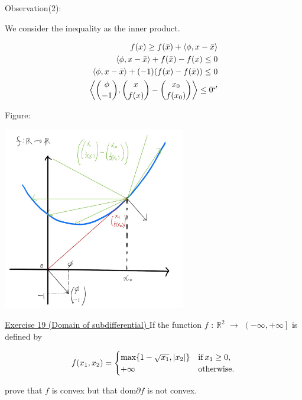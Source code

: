 \documentclass[a4paper,11pt]{jsarticle}
\begin{document}
Observation(2):

We consider the inequality as the inner product.

\begin{equation}
  \begin{split}
    f(x) \geq f(\bar{x}) + \left\langle \phi, x-\bar{x} \right\rangle\\
    \left\langle \phi, x-\bar{x} \right\rangle + f(\bar{x}) - f(x)\leq 0\\
    \left\langle \phi, x-\bar{x} \right\rangle + (-1)(f(x) - f(\bar{x}))\leq 0\\
    \left\langle \binom{\phi}{-1},\binom{x}{f(x)} - \binom{x_0}{f(x_0)} \right\rangle \leq 0 \notag`'
  \end{split}
\end{equation}

Figure:

\begin{center}
  \includegraphics[width=8cm]{figures/subgradient_(2).png}
\end{center}

\begin{itembox}[l]{\underline{Exercise 19 (Domain of subdifferential) }}
  If the function $f$ : $\mathbb{R}^2$ $\to$ $ \left ( -\infty ,+\infty \right ] $ is defined by

  \begin{equation}
    f(x_1,x_2) =
    \begin{cases}
      \text{max}\{1-\sqrt{x_1}, |x_2|  \} & \text{if}\:x_1 \geq 0, \\
      +\infty & \text{otherwise}. \notag
    \end{cases}
  \end{equation}

  prove that $f$ is convex but that $\text{dom}\partial f$ is not convex.
\end{itembox}
\end{document}
